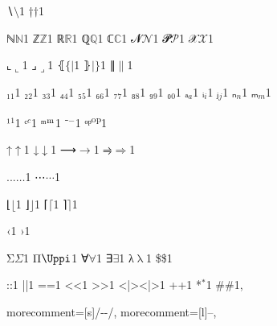 {{∖}{{\color{symbolcolor}\ensuremath{\setminus}}}1
{†}{{\color{symbolcolor}\ensuremath{\dag}}}1

{ℕ}{{\ensuremath{\mathbb{N}}}}1
{ℤ}{{\ensuremath{\mathbb{Z}}}}1
{ℝ}{{\ensuremath{\mathbb{R}}}}1
{ℚ}{{\ensuremath{\mathbb{Q}}}}1
{ℂ}{{\ensuremath{\mathbb{C}}}}1
{𝓝}{{\ensuremath{\mathcal{N}}}}1
{𝓟}{{\ensuremath{\mathcal{P}}}}1
{𝒳}{{\ensuremath{\mathcal{X}}}}1

{⌞}{{\ensuremath{\llcorner}}}1
{⌟}{{\ensuremath{\lrcorner}}}1
{⦃}{{\ensuremath{\{\!|}}}1
{⦄}{{\ensuremath{|\!\}}}}1
{∥}{{\ensuremath{\|}}}1

{₁}{{\ensuremath{_1}}}1
{₂}{{\ensuremath{_2}}}1
{₃}{{\ensuremath{_3}}}1
{₄}{{\ensuremath{_4}}}1
{₅}{{\ensuremath{_5}}}1
{₆}{{\ensuremath{_6}}}1
{₇}{{\ensuremath{_7}}}1
{₈}{{\ensuremath{_8}}}1
{₉}{{\ensuremath{_9}}}1
{₀}{{\ensuremath{_0}}}1
{ₐ}{{\ensuremath{_a}}}1
{ᵢ}{{\ensuremath{_i}}}1
{ⱼ}{{\ensuremath{_j}}}1
{ₙ}{{\ensuremath{_n}}}1
{ₘ}{{\ensuremath{_m}}}1

{¹}{{\ensuremath{^1}}}1
{ᶜ}{{\color{symbolcolor}\ensuremath{^c}}}1
{ᵐ}{{\color{symbolcolor}\ensuremath{\textsuperscript{m}}}}1
{⁻}{{\ensuremath{^{-}}}}1
{ᵒᵖ}{{\color{symbolcolor}\textsuperscript{op}}}1

{↑}{{\color{symbolcolor}\ensuremath{\uparrow}}}1
{↓}{{\color{symbolcolor}\ensuremath{\downarrow}}}1
{⟶}{{\color{symbolcolor}\ensuremath{\longrightarrow}}}1
{⥤}{{\color{symbolcolor}\ensuremath{\Rightarrow}}}1

{...}{{\ensuremath{\ldots}}}1
{⋯}{{\color{symbolcolor}\ensuremath{\cdots}}}1

{⌊}{{\ensuremath{\lfloor}}}1
{⌋}{{\ensuremath{\rfloor}}}1
{⌈}{{\ensuremath{\lceil}}}1
{⌉}{{\ensuremath{\rceil}}}1

{‹}{{\guilsinglleft}}1
{›}{{\guilsinglright}}1

{Σ}{{\color{symbolcolor}\ensuremath{\Sigma}}}1
{Π}{{\color{symbolcolor}\ensuremath{\Uppi}}}1 %
{∀}{{\color{symbolcolor}\ensuremath{\forall}}}1
{∃}{{\color{symbolcolor}\ensuremath{\exists}}}1
{λ}{{\color{symbolcolor}\ensuremath{\uplambda}}}1
{\$}{{\color{symbolcolor}\$}}1

{:}{{\color{symbolcolor}:}}1
{|}{{\color{symbolcolor}|}}1
{=}{{\color{symbolcolor}=}}1
{<}{{\color{symbolcolor}<}}1
{>}{{\color{symbolcolor}>}}1
{<|>}{{\color{symbolcolor}<|>}}1
{+}{{\color{symbolcolor}+}}1
{*}{{\color{symbolcolor}\ensuremath{{}^{*}}}}1
{\#}{{\color{keywordcolor}\#}}1, %

morecomment=[s]{/-}{-/},
morecomment=[l]{--},

}
